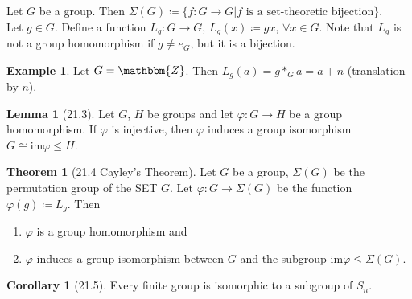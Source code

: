 \documentclass{article}
\newcommand{\Z}{\mathbbm{Z}}
\newcommand{\coleq}{\coloneqq}
\newcommand{\func}[3]{#1: #2 \to #3}
\theoremstyle{definition}
\newtheorem*{cor}{Corollary}
\newtheorem*{thm}{Theorem}
\newtheorem*{ex}{Example}
\newtheorem*{lem}{Lemma}
\theoremstyle{remark}
\newcommand{\im}[1]{\mathrm{im}#1}
\newcommand{\iso}{\cong}
\begin{document}
{{        \noindent Let $G$ be a group. Then $\Sigma(G)\coleq\{\func{f}{G}{G}|f\text{ is a set-theoretic bijection}\}$.\\
        Let $g \in G$. Define a function $\func{L_g}{G}{G}$, $L_g(x)\coleq gx$, $\forall x\in G$. Note that $L_g$ is not a group homomorphism if $g\neq e_G$, but it is a bijection.
        
        \begin{ex}
            Let $G=\Z$. Then $L_g(a)=g*_Ga=a+n$ (translation by $n$).
        \end{ex}
        
        \begin{lem}[21.3]
            Let $G$, $H$ be groups and let $\func{\varphi}{G}{H}$ be a group homomorphism. If $\varphi$ is injective, then $\varphi$ induces a group isomorphism $G\iso \im\varphi\leq H$.
        \end{lem}
        
        \begin{thm}[21.4 Cayley's Theorem]
            Let $G$ be a group, $\Sigma(G)$ be the permutation group of the SET $G$. Let $\func{\varphi}{G}{\Sigma(G)}$ be the function $\varphi(g)\coleq L_g$. Then
            \begin{enumerate}
                \item $\varphi$ is a group homomorphism and
                \item $\varphi$ induces a group isomorphism between $G$ and the subgroup $\im\varphi\leq \Sigma(G)$.
            \end{enumerate}
        \end{thm}
        
        \begin{cor}[21.5]
            Every finite group is isomorphic to a subgroup of $S_n$.
        \end{cor}
        }
    }
    
\end{document}
